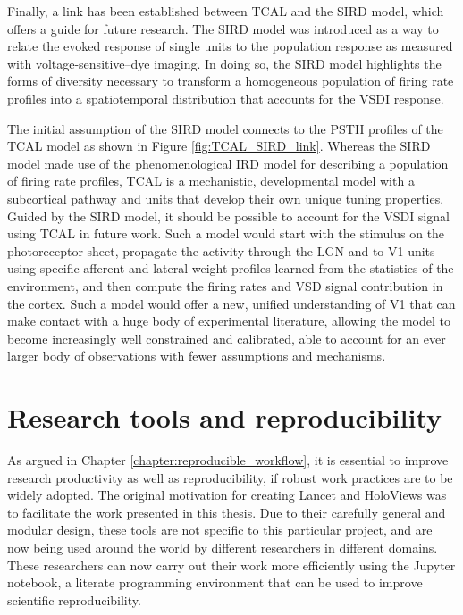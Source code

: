 \documentclass[phd,ianc,twoside]{infthesis}
\begin{document}
Finally, a link has been established between TCAL and the SIRD model, which offers a
guide for future research. The SIRD model was introduced as a way to relate
the evoked response of single units to the population response as
measured with voltage-sensitive--dye imaging. In doing so, the SIRD
model highlights the forms of diversity necessary to transform a
homogeneous population of firing rate profiles into a spatiotemporal
distribution that accounts for the VSDI response.

The initial assumption of the SIRD model connects to the PSTH
profiles of the TCAL model as shown in Figure
\ref{fig:TCAL_SIRD_link}. Whereas the SIRD model made use of the
phenomenological IRD model for describing a population of firing rate
profiles, TCAL is a mechanistic, developmental model with a
subcortical pathway and units that develop their own unique tuning
properties. Guided by the SIRD model, it should be possible to account
for the VSDI signal using TCAL in future work. Such a model would
start with the stimulus on the photoreceptor sheet, propagate the
activity through the LGN and to V1 units using specific afferent and
lateral weight profiles learned from the statistics of the
environment, and then compute the firing rates and VSD signal
contribution in the cortex. Such a model would offer a new, unified
understanding of V1 that can make contact with a huge body of
experimental literature, allowing the model to become increasingly
well constrained and calibrated, able to account for an ever larger
body of observations with fewer assumptions and mechanisms.

\section{Research tools and reproducibility}

As argued in Chapter \ref{chapter:reproducible_workflow}, it is
essential to improve research productivity as well as reproducibility, if
robust work practices are to be widely adopted. The original motivation
for creating Lancet and HoloViews was to facilitate the work presented
in this thesis. Due to their carefully general and modular design, these tools are not
specific to this particular project, and are now being used around the
world by different researchers in different domains. These researchers
can now carry out their work more efficiently using the Jupyter notebook, a
literate programming environment that can be used to improve scientific
reproducibility.
\end{document}

